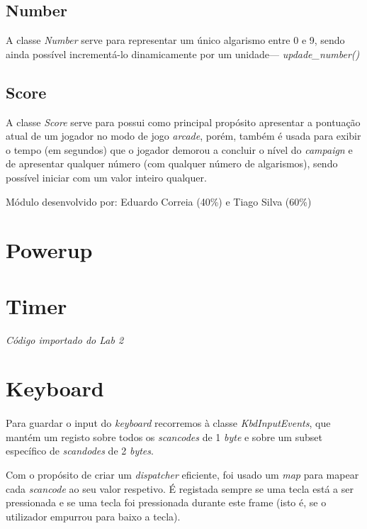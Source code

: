 \documentclass{report}
\begin{document}
\subsection{Number}

A classe \textit{Number} serve para representar um único algarismo entre 0 e 9, sendo ainda possível incrementá-lo dinamicamente por um unidade\footnotemark --- \textit{updade\_number()} \newline


\subsection{Score}

A classe \textit{Score} serve para  possui como principal propósito apresentar a pontuação atual de um jogador no modo de jogo \textit{arcade}, porém, também é usada para exibir o tempo (em segundos) que o jogador demorou a concluir o nível do \textit{campaign} e de apresentar qualquer número (com qualquer número de algarismos), sendo possível iniciar com um valor inteiro qualquer.

Módulo desenvolvido por: Eduardo Correia (40\%) e Tiago Silva (60\%) 

\section{Powerup}

\section{Timer}

\textit{Código importado do Lab 2}\footnotemark

\section{Keyboard}

\paragraph{}
Para guardar o input do \textit{keyboard} recorremos à classe \textit{KbdInputEvents}, que mantém um registo sobre todos os \textit{scancodes} de 1 \textit{byte} e sobre um subset específico de \textit{scandodes} de 2 \textit{bytes}.

Com o propósito de criar um \textit{dispatcher} eficiente, foi usado um \textit{map} para mapear cada \textit{scancode} ao seu valor respetivo. É registada sempre se uma tecla está a ser pressionada e se uma tecla foi pressionada durante este frame (isto é, se o utilizador empurrou para baixo a tecla).
\end{document}
